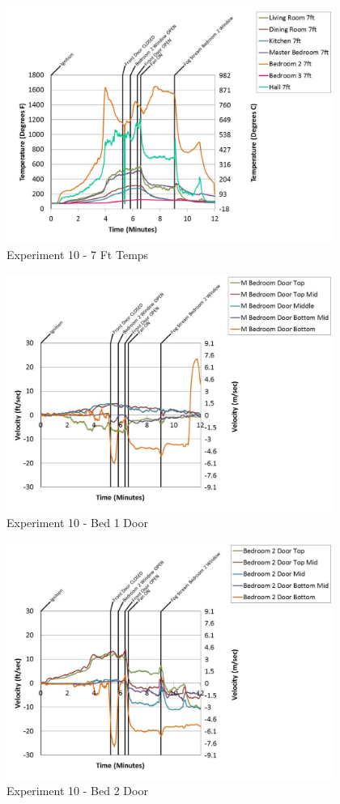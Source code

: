 \documentclass{article}
\begin{document}
\begin{appendices}
	\begin{figure}[h!]
		\centering
		\includegraphics[height=3.05in]{0_Images/Results_Charts/Exp_10_Charts/7FtTemps.pdf}
		\caption{Experiment 10 - 7 Ft Temps}
	\end{figure}
 
	\clearpage

	\begin{figure}[h!]
		\centering
		\includegraphics[height=3.05in]{0_Images/Results_Charts/Exp_10_Charts/Bed1Door.pdf}
		\caption{Experiment 10 - Bed 1 Door}
	\end{figure}
 

	\begin{figure}[h!]
		\centering
		\includegraphics[height=3.05in]{0_Images/Results_Charts/Exp_10_Charts/Bed2Door.pdf}
		\caption{Experiment 10 - Bed 2 Door}
	\end{figure}
 

\end{appendices}
\end{document}
